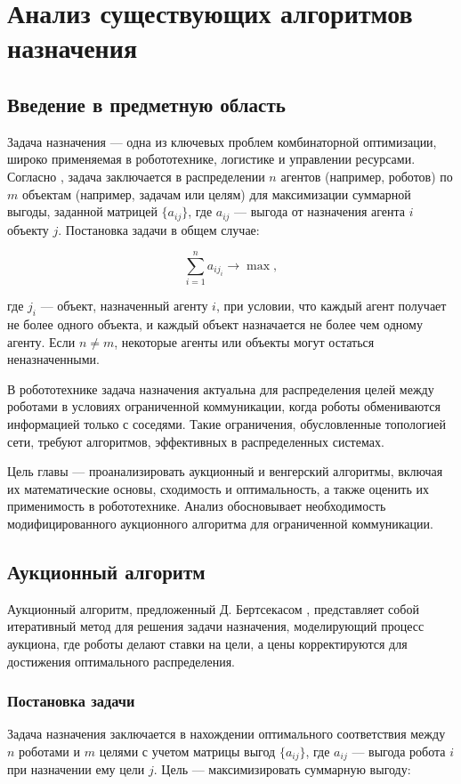 \chapter{Анализ существующих алгоритмов назначения}
\label{ch:analysis}

\section{Введение в предметную область}
Задача назначения --- одна из ключевых проблем комбинаторной оптимизации, широко применяемая в робототехнике, логистике и управлении ресурсами. Согласно \cite{bertsekas1990}, задача заключается в распределении \( n \) агентов (например, роботов) по \( m \) объектам (например, задачам или целям) для максимизации суммарной выгоды, заданной матрицей \( \{a_{ij}\} \), где \( a_{ij} \) --- выгода от назначения агента \( i \) объекту \( j \). Постановка задачи в общем случае:

\[
\sum_{i=1}^n a_{i j_i} \to \max,
\]

где \( j_i \) --- объект, назначенный агенту \( i \), при условии, что каждый агент получает не более одного объекта, и каждый объект назначается не более чем одному агенту. Если \( n \neq m \), некоторые агенты или объекты могут остаться неназначенными.

В робототехнике задача назначения актуальна для распределения целей между роботами в условиях ограниченной коммуникации, когда роботы обмениваются информацией только с соседями. Такие ограничения, обусловленные топологией сети, требуют алгоритмов, эффективных в распределенных системах.

Цель главы --- проанализировать аукционный и венгерский алгоритмы, включая их математические основы, сходимость и оптимальность, а также оценить их применимость в робототехнике. Анализ обосновывает необходимость модифицированного аукционного алгоритма для ограниченной коммуникации.


\section{Аукционный алгоритм}
Аукционный алгоритм, предложенный Д. Бертсекасом \cite{bertsekas1990}, представляет собой итеративный метод для решения задачи назначения, моделирующий процесс аукциона, где роботы делают ставки на цели, а цены корректируются для достижения оптимального распределения.

\subsection{Постановка задачи}
Задача назначения заключается в нахождении оптимального соответствия между \( n \) роботами и \( m \) целями с учетом матрицы выгод \( \{a_{ij}\} \), где \( a_{ij} \) --- выгода робота \( i \) при назначении ему цели \( j \). Цель --- максимизировать суммарную выгоду:

